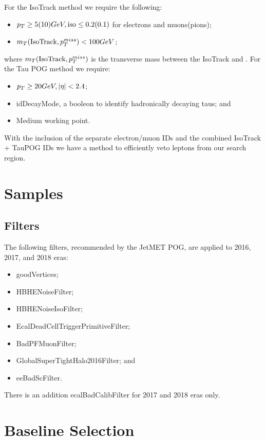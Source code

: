 For the IsoTrack method we require the following:
\begin{itemize}
	\item $p_{T}\geq5(10) GeV, \text{iso}\leq0.2(0.1)$ for electrons and muons(pions);
	\item $m_T(\text{IsoTrack},p_{T}^{miss})<100 GeV$;
\end{itemize}
where $m_T(\text{IsoTrack},p_{T}^{miss})$ is the transverse mass between the IsoTrack and \met. For the Tau POG method we require:
\begin{itemize}
	\item $p_{T}\geq20 GeV, |\eta|<2.4$;
	\item idDecayMode, a booleon to identify hadronically decaying taus; and
	\item Medium working point.
\end{itemize}
With the inclusion of the separate electron/muon IDs and the combined IsoTrack + TauPOG IDs we have a method to efficiently veto leptons from our search region.

\section{Samples}\label{Samples}



\subsection{Filters}
The following filters, recommended by the JetMET POG, are applied to 2016, 2017, and 2018 eras:
\begin{itemize}
	\item goodVertices;
	\item HBHENoiseFilter;
	\item HBHENoiseIsoFilter;
	\item EcalDeadCellTriggerPrimitiveFilter;
	\item BadPFMuonFilter;
	\item GlobalSuperTightHalo2016Filter; and
	\item eeBadScFilter.
\end{itemize}
There is an addition ecalBadCalibFilter for 2017 and 2018 eras only.

\section{Baseline Selection} \label{sec:Baseline}

